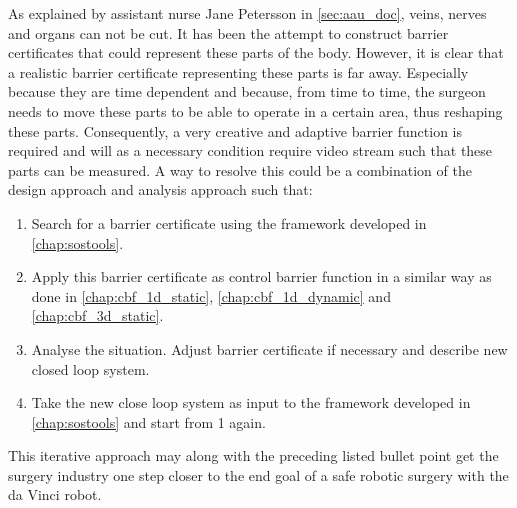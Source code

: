 As explained by assistant nurse Jane Petersson in \autoref{sec:aau_doc}, veins, nerves and organs can not be cut. It has been the attempt to construct barrier certificates that could represent these parts of the body. However, it is clear that a realistic barrier certificate representing these parts is far away. Especially because they are time dependent and because, from time to time, the surgeon needs to move these parts to be able to operate in a certain area, thus reshaping these parts. Consequently, a very creative and adaptive barrier function is required and will as a necessary condition require video stream such that these parts can be measured. A way to resolve this could be a combination of the design approach and analysis approach such that:
\begin{enumerate}
\item Search for a barrier certificate using the framework developed in \autoref{chap:sostools}.
\item Apply this barrier certificate as control barrier function in a similar way as done in \autoref{chap:cbf_1d_static}, \autoref{chap:cbf_1d_dynamic} and \autoref{chap:cbf_3d_static}.
\item Analyse the situation. Adjust barrier certificate if necessary and describe new closed loop system.
\item Take the new close loop system as input to the framework developed in \autoref{chap:sostools} and start from 1 again.
\end{enumerate}
This iterative approach may along with the preceding listed bullet point get the surgery industry one step closer to the end goal of a safe robotic surgery with the da Vinci robot. 

